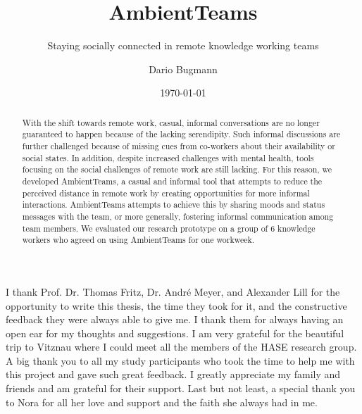 \documentclass{seal_thesis}
\date{\today}
\title{AmbientTeams}
\subtitle{Staying socially connected in remote knowledge working teams}
\author{Dario Bugmann}
\begin{document}
\maketitle

\frontmatter

\begin{acknowledgements}
    I thank Prof. Dr. Thomas Fritz, Dr. André Meyer, and Alexander Lill for the opportunity to write this thesis, the time they took for it, and the constructive feedback they were always able to give me. I thank them for always having an open ear for my thoughts and suggestions. I am very grateful for the beautiful trip to Vitznau where I could meet all the members of the HASE research group. A big thank you to all my study participants who took the time to help me with this project and gave such great feedback. I greatly appreciate my family and friends and am grateful for their support. Last but not least, a special thank you to Nora for all her love and support and the faith she always had in me.
\end{acknowledgements}

\begin{abstract}
    With the shift towards remote work, casual, informal conversations are no longer guaranteed to happen because of the lacking serendipity. Such informal discussions are further challenged because of missing cues from co-workers about their availability or social states. In addition, despite increased challenges with mental health, tools focusing on the social challenges of remote work are still lacking. For this reason, we developed AmbientTeams, a casual and informal tool that attempts to reduce the perceived distance in remote work by creating opportunities for more informal interactions. AmbientTeams attempts to achieve this by sharing moods and status messages with the team, or more generally, fostering informal communication among team members. We evaluated our research prototype on a group of 6 knowledge workers who agreed on using AmbientTeams for one workweek.
\end{abstract}
\end{document}
